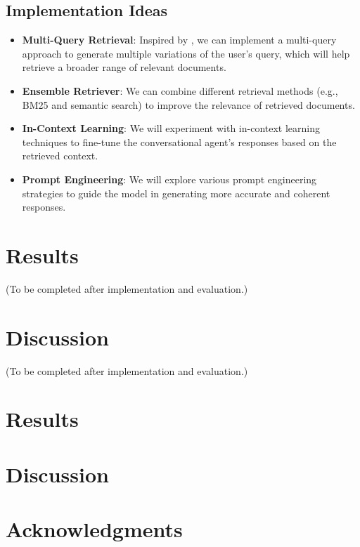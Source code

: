 \documentclass[fleqn,moreauthors,10pt]{ds_report}
\begin{document}
\subsection*{Implementation Ideas}
\begin{itemize}
    \item \textbf{Multi-Query Retrieval}: Inspired by \cite{afzal2024towards}, we can implement a multi-query approach to generate multiple variations of the user's query, which will help retrieve a broader range of relevant documents.
    \item \textbf{Ensemble Retriever}: We can combine different retrieval methods (e.g., BM25 and semantic search) to improve the relevance of retrieved documents.
    \item \textbf{In-Context Learning}: We will experiment with in-context learning techniques to fine-tune the conversational agent's responses based on the retrieved context.
    \item \textbf{Prompt Engineering}: We will explore various prompt engineering strategies to guide the model in generating more accurate and coherent responses.
\end{itemize}


\section*{Results}
(To be completed after implementation and evaluation.)


\section*{Discussion}
(To be completed after implementation and evaluation.)


\section*{Results}


\section*{Discussion}



\section*{Acknowledgments}



\end{document}
